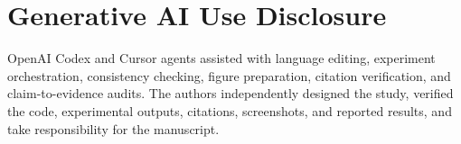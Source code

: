 \documentclass[sigconf,anonymous,review]{acmart}
\begin{document}
\maketitle








\FloatBarrier



\section*{Generative AI Use Disclosure}
OpenAI Codex and Cursor agents assisted with language editing, experiment orchestration,
consistency checking, figure preparation, citation verification, and claim-to-evidence audits.
The authors independently designed the study, verified the code, experimental outputs, citations,
screenshots, and reported results, and take responsibility for the manuscript.
\end{document}
